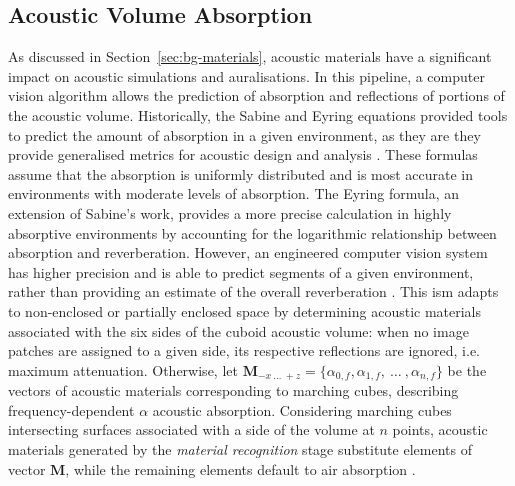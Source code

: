 \subsection{Acoustic Volume Absorption}
As discussed in Section~\ref{sec:bg-materials}, acoustic materials have a significant impact on acoustic simulations and auralisations. In this pipeline, a computer vision algorithm allows the prediction of absorption and reflections of portions of the acoustic volume. Historically, the Sabine and Eyring equations provided tools to predict the amount of absorption in a given environment, as they are they provide generalised metrics for acoustic design and analysis \citep{beranek2006analysis}. These formulas assume that the absorption is uniformly distributed and is most accurate in environments with moderate levels of absorption. The Eyring formula, an extension of Sabine's work, provides a more precise calculation in highly absorptive environments by accounting for the logarithmic relationship between absorption and reverberation. However, an engineered computer vision system has higher precision and is able to predict segments of a given environment, rather than providing an estimate of the overall reverberation \citep{schissler2017acoustic}.
This \acrshort{ism} adapts to non-enclosed or partially enclosed space by determining acoustic materials associated with the six sides of the cuboid acoustic volume: when no image patches are assigned to a given side, its respective reflections are ignored, i.e. maximum attenuation. Otherwise, let $\mathbf{M}_{-x~\dots~+z} = \{ \alpha_{0, f}, \alpha_{1, f},~\dots~, \alpha_{n, f} \}$ be the vectors of acoustic materials corresponding to marching cubes, describing frequency-dependent $\alpha$ acoustic absorption. Considering marching cubes intersecting surfaces associated with a side of the volume at $n$ points, acoustic materials generated by the \emph{material recognition} stage substitute elements of vector $\mathbf{M}$, while the remaining elements default to air absorption \citep{kates2020adding}.\par

